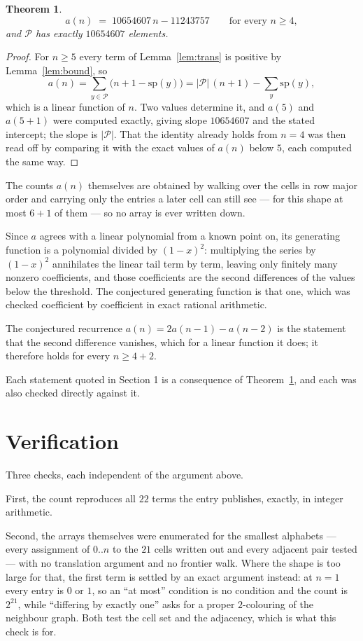\documentclass[11pt,a4paper]{article}
\theoremstyle{plain}
\newtheorem{theorem}{Theorem}
\theoremstyle{definition}
\begin{document}
\begin{theorem}\label{thm:line}
\[
a(n)\;=\;10654607\,n-11243757\qquad\text{for every }n\ge4,
\]
and $\mathcal P$ has exactly $10654607$ elements.
\end{theorem}

\begin{proof}
For $n\ge5$ every term of Lemma~\ref{lem:trans} is positive by
Lemma~\ref{lem:bound}, so
\[
a(n)=\sum_{y\in\mathcal P}\bigl(n+1-\mathrm{sp}(y)\bigr)
=|\mathcal P|\,(n+1)-\sum_{y}\mathrm{sp}(y),
\]
which is a linear function of $n$. Two values determine it, and $a(5)$ and
$a(5+1)$ were computed exactly, giving slope $10654607$ and the stated intercept; the slope
is $|\mathcal P|$. That the identity already holds from $n=4$ was then read off by
comparing it with the exact values of $a(n)$ below $5$, each computed the same way.
\end{proof}

The counts $a(n)$ themselves are obtained by walking over the cells in row major order and
carrying only the entries a later cell can still see --- for this shape at most $6+1$ of
them --- so no array is ever written down.

Since $a$ agrees with a linear polynomial from a known point on, its generating function is a
polynomial divided by $(1-x)^2$: multiplying the series by $(1-x)^2$ annihilates the linear
tail term by term, leaving only finitely many nonzero coefficients, and those coefficients are
the second differences of the values below the threshold. The conjectured generating function
is that one, which was checked coefficient by coefficient in exact rational arithmetic.

The conjectured recurrence $a(n)=2a(n-1)-a(n-2)$ is the statement that the second difference
vanishes, which for a linear function it does; it therefore holds for every $n\ge4+2$.

Each statement quoted in Section 1 is a consequence of Theorem~\ref{thm:line}, and each was
also checked directly against it.

\section{Verification}

Three checks, each independent of the argument above.

First, the count reproduces all $22$ terms the entry publishes, exactly, in integer
arithmetic.

Second, the arrays themselves were enumerated for the smallest alphabets --- every assignment
of $0..n$ to the $21$ cells written out and every adjacent pair tested --- with no
translation argument and no frontier walk. Where the shape is too large for that, the first
term is settled by an exact argument instead: at $n=1$ every entry is $0$ or $1$, so an ``at
most'' condition is no condition and the count is $2^{21}$, while ``differing by exactly
one'' asks for a proper $2$-colouring of the neighbour graph. Both test the cell set and the
adjacency, which is what this check is for.
\end{document}
